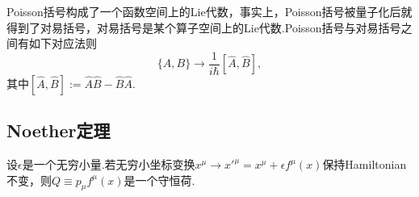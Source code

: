 		Poisson括号构成了一个函数空间上的Lie代数，事实上，Poisson括号被量子化后就得到了对易括号，对易括号是某个算子空间上的Lie代数.Poisson括号与对易括号之间有如下对应法则
		\begin{equation}
		\{A,B\}\rightarrow\frac{1}{i\hbar}[\hat{A},\hat{B}],
		\end{equation}
		其中$[\hat{A},\hat{B}]:=\hat{A}\hat{B}-\hat{B}\hat{A}$.
	
	\subsection{Noether定理}
		\begin{theorem}
		设$\epsilon$是一个无穷小量.若无穷小坐标变换$x^\mu\rightarrow x'^\mu=x^\mu+\epsilon f^\mu(x)$保持Hamiltonian不变，则$Q\equiv p_\mu f^\mu(x)$是一个守恒荷.
		\end{theorem}
